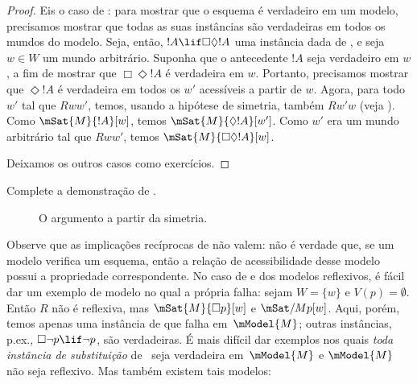 \documentclass[../../../include/open-logic-section]{subfiles}
\begin{document}
\begin{proof}
  Eis o caso de : para mostrar que o esquema é verdadeiro em um modelo,
  precisamos mostrar que todas as suas instâncias são verdadeiras em todos os
  mundos do modelo. Seja, então, $!A \lif \Box\Diamond !A$ uma instância dada
  de , e seja $w \in W$ um mundo arbitrário. Suponha que o antecedente
  $!A$ seja verdadeiro em $w$, a fim de mostrar que $\Box \Diamond !A$ é
  verdadeira em $w$. Portanto, precisamos mostrar que $\Diamond !A$ é
  verdadeira em todos os $w'$ acessíveis a partir de $w$. Agora, para todo
  $w'$ tal que $Rww'$, temos, usando a hipótese de simetria, também $Rw'w$
  (veja ). Como $\mSat{M}{!A}[w]$, temos
  $\mSat{M}{\Diamond !A}[w']$. Como $w'$ era um mundo arbitrário tal que
  $Rww'$, temos $\mSat{M}{\Box\Diamond!A}[w]$.

  Deixamos os outros casos como exercícios.
\end{proof}

\begin{prob}
  Complete a demonstração de .
\end{prob}

\begin{figure}
  \begin{center}
  \end{center}
\caption{O argumento a partir da simetria.}
\end{figure}

Observe que as implicações recíprocas de  não valem:
não é verdade que, se um modelo verifica um esquema, então a relação de
acessibilidade desse modelo possui a propriedade correspondente. No caso de
 e dos modelos reflexivos, é fácil dar um exemplo de modelo no qual a
própria  falha: sejam $W = \{w\}$ e $V(p) = \emptyset$. Então $R$ não é
reflexiva, mas $\mSat{M}{\Box p}[w]$ e $\mSat/{M}{p}[w]$. Aqui, porém, temos
apenas uma instância de  que falha em~$\mModel{M}$; outras instâncias,
p.ex., $\Box \lnot p \lif \lnot p$, são verdadeiras. É mais difícil
dar exemplos nos quais \emph{toda instância de substituição} de~ seja
verdadeira em~$\mModel{M}$ e $\mModel{M}$ não seja reflexivo. Mas também
existem tais modelos:
\end{document}

